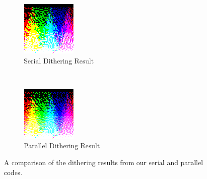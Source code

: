 \documentclass{article}
\begin{document}
\begin{figure}[h]
  \centering
  \begin{subfigure}[t]{0.40\textwidth}
    \centering
    \includegraphics[width=\textwidth]{images/dithered_RGB_color_gradient_100x100.png}
    \caption{Serial Dithering Result}
    \label{fig:serial_dithering_confirmation}
  \end{subfigure}
  ~
  \begin{subfigure}[t]{0.40\textwidth}
    \centering
    \includegraphics[width=\textwidth]{images/parallel_dithered_RGB_color_gradient_100x100.png}
    \caption{Parallel Dithering Result}
    \label{fig:parallel_dithering_confirmation}
  \end{subfigure}
  \caption{A comparison of the dithering results from our serial and parallel codes.}
\end{figure}
\end{document}
